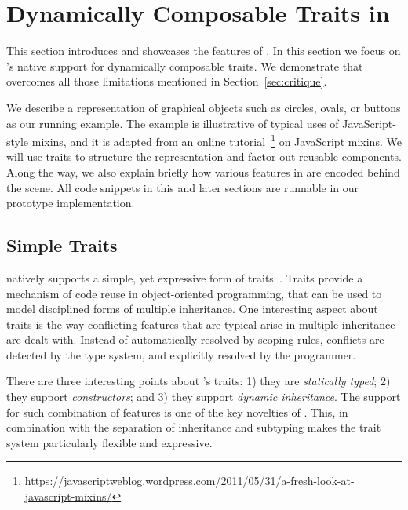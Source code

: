
\section{Dynamically Composable Traits in \name}
\label{sec:traits}

 

This section introduces and showcases the features of \name. 
In this section we focus on \name's native support
for dynamically composable traits. We demonstrate that \name overcomes all those
limitations mentioned in Section~\ref{sec:critique}.

We describe a representation of graphical objects such as circles, ovals, or
buttons as our running example. The example is illustrative of typical uses of
JavaScript-style mixins, and it is adapted from an online
tutorial~\footnote{\url{https://javascriptweblog.wordpress.com/2011/05/31/a-fresh-look-at-javascript-mixins/}}
on JavaScript mixins. We will use traits to structure the representation and
factor out reusable components. Along the way, we also explain briefly how
various features in \name are encoded behind the scene. All code snippets in
this and later sections are runnable in our prototype implementation.

\subsection{Simple Traits}

\name natively supports a simple, yet expressive form of
traits~\cite{scharli2003traits}.  Traits provide a mechanism of code
reuse in object-oriented programming, that can be used to model
disciplined forms of multiple inheritance. One interesting aspect
about traits is the way conflicting features that are typical arise in
multiple inheritance are dealt with. Instead of automatically resolved
by scoping rules, conflicts are detected by the type system, and
explicitly resolved by the programmer.

There are three interesting points about \name's traits: 1) they are
\emph{statically typed}; 2) they support \emph{constructors}; and 3)
they support \emph{dynamic inheritance}. The support for such
combination of features is one of the key novelties of \name. This, in
combination with the separation of inheritance and subtyping makes the
trait system particularly flexible and expressive.

